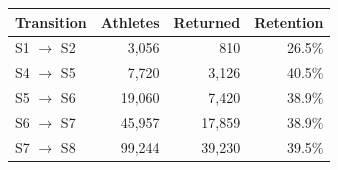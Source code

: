 \begin{tabular}{lrrr}
\toprule
\textbf{Transition} & \multicolumn{1}{r}{\textbf{Athletes}} & \multicolumn{1}{r}{\textbf{Returned}} & \multicolumn{1}{r}{\textbf{Retention}} \\
\midrule
S1 $\to$ S2 & 3,056 & 810 & 26.5\% \\
S4 $\to$ S5 & 7,720 & 3,126 & 40.5\% \\
S5 $\to$ S6 & 19,060 & 7,420 & 38.9\% \\
S6 $\to$ S7 & 45,957 & 17,859 & 38.9\% \\
S7 $\to$ S8 & 99,244 & 39,230 & 39.5\% \\
\bottomrule
\end{tabular}